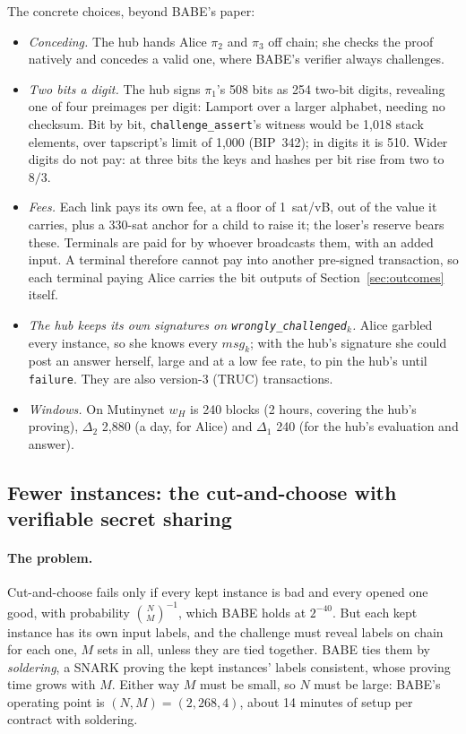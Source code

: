 \documentclass[11pt]{article}
\newcommand{\tx}[1]{\texttt{#1}}
\begin{document}
The concrete choices, beyond BABE's paper:
\begin{itemize}[leftmargin=1.5em]
\item \emph{Conceding.} The hub hands Alice $\pi_2$ and $\pi_3$ off
  chain; she checks the proof natively and concedes a valid one, where
  BABE's verifier always challenges.
\item \emph{Two bits a digit.} The hub signs $\pi_1$'s 508 bits as 254
  two-bit digits, revealing one of four preimages per digit: Lamport
  over a larger alphabet, needing no checksum. Bit by bit,
  \tx{challenge\_assert}'s witness would be 1,018 stack elements, over
  tapscript's limit of 1,000 (BIP~342); in digits it is 510. Wider digits
  do not pay: at three bits the keys and hashes per bit rise from two to
  $8/3$.
\item \emph{Fees.} Each link pays its own fee, at a floor of 1~sat/vB,
  out of the value it carries, plus a 330-sat anchor for a child to
  raise it; the loser's reserve bears these. Terminals are paid for by
  whoever broadcasts them, with an added input. A terminal therefore
  cannot pay into another pre-signed transaction, so each terminal paying
  Alice carries the bit outputs of Section~\ref{sec:outcomes} itself.
\item \emph{The hub keeps its own signatures on
  \tx{wrongly\_challenged}$_k$.} Alice garbled every instance, so she
  knows every $\mathit{msg}_k$; with the hub's signature she could post
  an answer herself, large and at a low fee rate, to pin the hub's
  until \tx{failure}. They are also version-3 (TRUC) transactions.
\item \emph{Windows.} On Mutinynet $w_H$ is 240 blocks (2 hours, covering
  the hub's proving), $\Delta_2$ 2,880 (a day, for Alice) and $\Delta_1$
  240 (for the hub's evaluation and answer).
\end{itemize}

\subsection{Fewer instances: the cut-and-choose with verifiable secret sharing}
\label{app:vsss}

\paragraph{The problem.} Cut-and-choose fails only if every kept
instance is bad and every opened one good, with probability
$\binom{N}{M}^{-1}$, which BABE holds at $2^{-40}$. But each kept
instance has its own input labels, and the challenge must reveal labels
on chain for each one, $M$ sets in all, unless they are tied together.
BABE ties them by \emph{soldering}, a SNARK proving the kept instances'
labels consistent, whose proving time grows with $M$. Either way $M$
must be small, so $N$ must be large: BABE's operating point is $(N, M) =
(2{,}268, 4)$, about 14 minutes of setup per contract with soldering.
\end{document}
